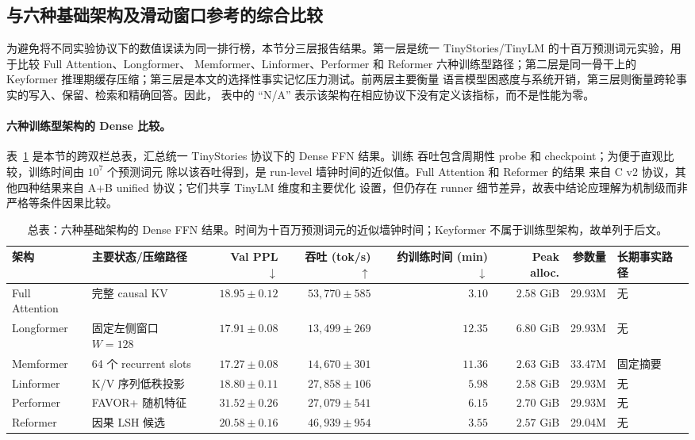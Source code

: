 \documentclass[letterpaper]{article}
\begin{document}
\subsection{与六种基础架构及滑动窗口参考的综合比较}

为避免将不同实验协议下的数值误读为同一排行榜，本节分三层报告结果。第一层是统一
TinyStories/TinyLM 的十百万预测词元实验，用于比较 Full Attention、Longformer、
Memformer、Linformer、Performer 和 Reformer 六种训练型路径\cite{beltagy2020longformer,
memformer2020,linformer2020,performer2021,reformer2020}；第二层是同一骨干上的
Keyformer 推理期缓存压缩；第三层是本文的选择性事实记忆压力测试。前两层主要衡量
语言模型困惑度与系统开销，第三层则衡量跨轮事实的写入、保留、检索和精确回答。因此，
表中的 ``N/A'' 表示该架构在相应协议下没有定义该指标，而不是性能为零。

\paragraph{六种训练型架构的 Dense 比较。}
表~\ref{tab:six-dense-comparison} 是本节的跨双栏总表，汇总统一 TinyStories 协议下的 Dense FFN 结果。训练
吞吐包含周期性 probe 和 checkpoint；为便于直观比较，训练时间由 $10^7$ 个预测词元
除以该吞吐得到，是 run-level 墙钟时间的近似值。Full Attention 和 Reformer 的结果
来自 C v2 协议，其他四种结果来自 A+B unified 协议；它们共享 TinyLM 维度和主要优化
设置，但仍存在 runner 细节差异，故表中结论应理解为机制级而非严格等条件因果比较。

\begin{table}[t]
\centering
\scriptsize
\caption{总表：六种基础架构的 Dense FFN 结果。时间为十百万预测词元的近似墙钟时间；Keyformer 不属于训练型架构，故单列于后文。}
\label{tab:six-dense-comparison}
\begin{tabular}{l l r r r r r l}
\toprule
架构 & 主要状态/压缩路径 & Val PPL $\downarrow$ & 吞吐 (tok/s) $\uparrow$ & 约训练时间 (min) $\downarrow$ & Peak alloc. & 参数量 & 长期事实路径 \\
\midrule
Full Attention & 完整 causal KV & $18.95\pm0.12$ & $53{,}770\pm585$ & $3.10$ & $2.58$ GiB & 29.93M & 无 \\
Longformer & 固定左侧窗口 $W=128$ & $17.91\pm0.08$ & $13{,}499\pm269$ & $12.35$ & $6.80$ GiB & 29.93M & 无 \\
Memformer & 64 个 recurrent slots & $17.27\pm0.08$ & $14{,}670\pm301$ & $11.36$ & $2.63$ GiB & 33.47M & 固定摘要 \\
Linformer & K/V 序列低秩投影 & $18.80\pm0.11$ & $27{,}858\pm106$ & $5.98$ & $2.58$ GiB & 29.93M & 无 \\
Performer & FAVOR+ 随机特征 & $31.52\pm0.26$ & $27{,}079\pm541$ & $6.15$ & $2.70$ GiB & 29.93M & 无 \\
Reformer & 因果 LSH 候选 & $20.58\pm0.16$ & $46{,}939\pm954$ & $3.55$ & $2.57$ GiB & 29.04M & 无 \\
\bottomrule
\end{tabular}
\end{table}
\end{document}
